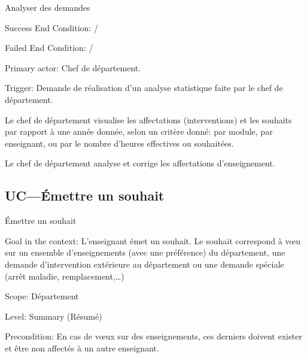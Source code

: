 \begin{ocl}
\begin{usecase}{Analyser des demandes}
\begin{information}
 \item[Success End Condition:]
/

 \item[Failed End Condition:]
 /

 \item[Primary actor:]
 Chef de département.

 \item[Trigger:]
 Demande de réalisation d'un analyse statistique faite par le chef de département.\\
\end{information}

\begin{scenario}
	\item Le chef de département visualise les affectations (interventions) et les souhaits par rapport à une année donnée, selon un critère donné: par module, par enseignant, ou par le nombre d'heures effectives ou souhaitées.
	\item Le chef de département analyse et corrige les affectations d'enseignement.
\end{scenario}

\end{usecase}

\subsection{UC---Émettre un souhait}

\begin{usecase}{\'Emettre un souhait}\label{usecase:souhait}
\begin{information}

\item [{Goal in the context:}]
 L'enseignant émet un souhait. Le souhait correspond à vœu sur un ensemble d'enseignements (avec une préférence) du département, une demande d'intervention extérieure au département ou une demande spéciale (arrêt maladie, remplacement,\dots)

\item[Scope:] Département

\item [{Level:}] Summary (Résumé)

\item[{Precondition:}]
 En cas de vœux sur des enseignements, ces derniers doivent exister et être non affectés à un autre enseignant.


\end{information}
\end{usecase}
\end{ocl}
